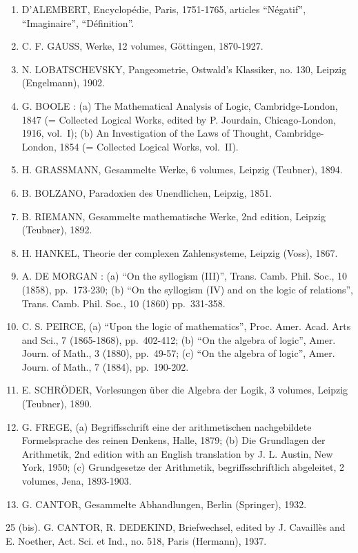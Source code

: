 \begin{enumerate}
\def\labelenumi{\arabic{enumi}.}
\setcounter{enumi}{12}
\item
  D'ALEMBERT, Encyclopédie, Paris, 1751-1765, articles ``Négatif'', ``Imaginaire'', ``Définition''.
\item
  C. F. GAUSS, Werke, 12 volumes, Göttingen, 1870-1927.
\item
  N. LOBATSCHEVSKY, Pangeometrie, Ostwald's Klassiker, no. 130, Leipzig (Engelmann), 1902.
\item
  G. BOOLE : (a) The Mathematical Analysis of Logic, Cambridge-London, 1847 (= Collected Logical Works, edited by P. Jourdain, Chicago-London, 1916, vol.~I); (b) An Investigation of the Laws of Thought, Cambridge-London, 1854 (= Collected Logical Works, vol.~II).
\item
  H. GRASSMANN, Gesammelte Werke, 6 volumes, Leipzig (Teubner), 1894.
\item
  B. BOLZANO, Paradoxien des Unendlichen, Leipzig, 1851.
\item
  B. RIEMANN, Gesammelte mathematische Werke, 2nd edition, Leipzig (Teubner), 1892.
\item
  H. HANKEL, Theorie der complexen Zahlensysteme, Leipzig (Voss), 1867.
\item
  A. DE MORGAN : (a) ``On the syllogism (III)'', Trans. Camb. Phil. Soc., 10 (1858), pp.~173-230; (b) ``On the syllogism (IV) and on the logic of relations'', Trans. Camb. Phil. Soc., 10 (1860) pp.~331-358.
\item
  C. S. PEIRCE, (a) ``Upon the logic of mathematics'', Proc. Amer. Acad. Arts and Sci., 7 (1865-1868), pp.~402-412; (b) ``On the algebra of logic'', Amer. Journ. of Math., 3 (1880), pp.~49-57; (c) ``On the algebra of logic'', Amer. Journ. of Math., 7 (1884), pp.~190-202.
\item
  E. SCHRÖDER, Vorlesungen über die Algebra der Logik, 3 volumes, Leipzig (Teubner), 1890.
\item
  G. FREGE, (a) Begriffsschrift eine der arithmetischen nachgebildete Formelsprache des reinen Denkens, Halle, 1879; (b) Die Grundlagen der Arithmetik, 2nd edition with an English translation by J. L. Austin, New York, 1950; (c) Grundgesetze der Arithmetik, begriffsschriftlich abgeleitet, 2 volumes, Jena, 1893-1903.
\item
  G. CANTOR, Gesammelte Abhandlungen, Berlin (Springer), 1932.
\end{enumerate}

25 (bis). G. CANTOR, R. DEDEKIND, Briefwechsel, edited by J. Cavaillès and E. Noether, Act. Sci. et Ind., no. 518, Paris (Hermann), 1937.

